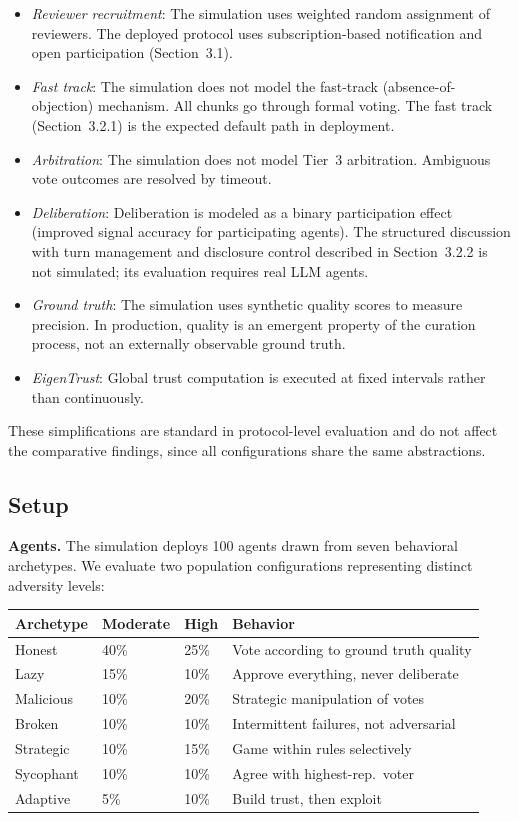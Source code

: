 \documentclass[11pt]{article}
\begin{document}
\begin{itemize}
\item \textit{Reviewer recruitment}: The simulation uses weighted random assignment of reviewers. The deployed protocol uses subscription-based notification and open participation (Section~3.1).
\item \textit{Fast track}: The simulation does not model the fast-track (absence-of-objection) mechanism. All chunks go through formal voting. The fast track (Section~3.2.1) is the expected default path in deployment.
\item \textit{Arbitration}: The simulation does not model Tier~3 arbitration. Ambiguous vote outcomes are resolved by timeout.
\item \textit{Deliberation}: Deliberation is modeled as a binary participation effect (improved signal accuracy for participating agents). The structured discussion with turn management and disclosure control described in Section~3.2.2 is not simulated; its evaluation requires real LLM agents.
\item \textit{Ground truth}: The simulation uses synthetic quality scores to measure precision. In production, quality is an emergent property of the curation process, not an externally observable ground truth.
\item \textit{EigenTrust}: Global trust computation is executed at fixed intervals rather than continuously.
\end{itemize}

These simplifications are standard in protocol-level evaluation and do not affect the comparative findings, since all configurations share the same abstractions.

\subsection{Setup}

\textbf{Agents.} The simulation deploys 100 agents drawn from seven behavioral archetypes. We evaluate two population configurations representing distinct adversity levels:

\begin{table}[h]
\centering
\small
\begin{tabular}{llll}
\toprule
\textbf{Archetype} & \textbf{Moderate} & \textbf{High} & \textbf{Behavior} \\
\midrule
Honest & 40\% & 25\% & Vote according to ground truth quality \\
Lazy & 15\% & 10\% & Approve everything, never deliberate \\
Malicious & 10\% & 20\% & Strategic manipulation of votes \\
Broken & 10\% & 10\% & Intermittent failures, not adversarial \\
Strategic & 10\% & 15\% & Game within rules selectively \\
Sycophant & 10\% & 10\% & Agree with highest-rep.\ voter \\
Adaptive & 5\% & 10\% & Build trust, then exploit \\
\bottomrule
\end{tabular}
\end{table}
\end{document}
